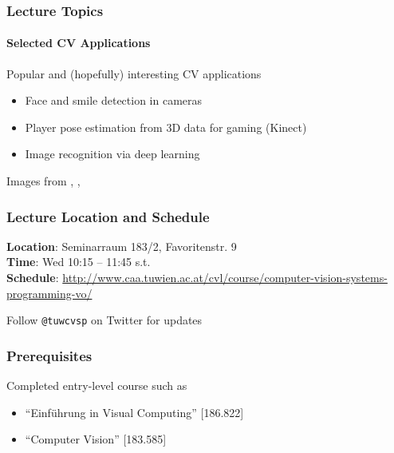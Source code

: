 \documentclass[xetex,professionalfont]{beamer}
\begin{document}

\begin{frame}
\frametitle{Lecture Topics}
\framesubtitle{Selected CV Applications}

Popular and (hopefully) interesting CV applications
\begin{itemize}
	\item Face and smile detection in cameras
	\item Player pose estimation from 3D data for gaming (Kinect)
	\item Image recognition via deep learning
\end{itemize}

\bigskip
\begin{center}
	{\centering Images from \cite{lecun1989}, \cite{shotton2011}, \cite{taigman2013}}
\end{center}

\end{frame}


\begin{frame}
\frametitle{Lecture Location and Schedule}

\textbf{Location}: Seminarraum 183/2, Favoritenstr. 9\\\medskip
\textbf{Time}: Wed 10:15 -- 11:45 s.t. \\\medskip
\textbf{Schedule}: \url{http://www.caa.tuwien.ac.at/cvl/course/computer-vision-systems-programming-vo/}

\bigskip
Follow \texttt{@tuwcvsp} on Twitter for updates

\end{frame}


\begin{frame}
\frametitle{Prerequisites}

Completed entry-level course such as
\begin{itemize}
	\item \enquote{Einführung in Visual Computing} [186.822]
	\item \enquote{Computer Vision} [183.585]
\end{itemize}

\end{frame}
\end{document}
